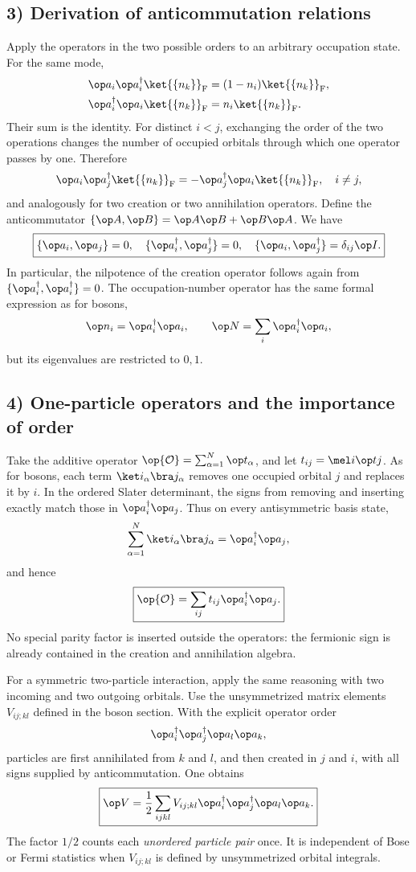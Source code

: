 \subsection*{3) Derivation of anticommutation relations}

Apply the operators in the two possible orders to an arbitrary occupation state. For the same mode,
\[\begin{aligned}
\op a_i\op a_i^\dagger\ket{\{n_k\}}_{\mathrm F}
 &=(1-n_i)\ket{\{n_k\}}_{\mathrm F},\\
\op a_i^\dagger\op a_i\ket{\{n_k\}}_{\mathrm F}
 &=n_i\ket{\{n_k\}}_{\mathrm F}.
\end{aligned}\]
Their sum is the identity. For distinct $i<j$, exchanging the order of the two operations changes the number of occupied orbitals through which one operator passes by one. Therefore
\[\op a_i\op a_j^\dagger\ket{\{n_k\}}_{\mathrm F}
 =-\op a_j^\dagger\op a_i\ket{\{n_k\}}_{\mathrm F},\quad i\ne j,\]
and analogously for two creation or two annihilation operators. Define the anticommutator $\{\op A,\op B\}=\op A\op B+\op B\op A$. We have
\[\boxed{\{\op a_i,\op a_j\}=0,\quad
\{\op a_i^\dagger,\op a_j^\dagger\}=0,\quad
\{\op a_i,\op a_j^\dagger\}=\delta_{ij}\op I.}\]
In particular, the nilpotence of the creation operator follows again from $\{\op a_i^\dagger,\op a_i^\dagger\}=0$. The occupation-number operator has the same formal expression as for bosons,
\[\op n_i=\op a_i^\dagger\op a_i,\qquad
\op N=\sum_i\op a_i^\dagger\op a_i,\]
but its eigenvalues are restricted to $0,1$.

\subsection*{4) One-particle operators and the importance of order}

Take the additive operator $\op{\mathcal O}=\sum_{\alpha=1}^N\op t_\alpha$, and let $t_{ij}=\mel i{\op t}j$. As for bosons, each term $\ket i_\alpha\bra j_\alpha$ removes one occupied orbital $j$ and replaces it by $i$. In the ordered Slater determinant, the signs from removing and inserting exactly match those in $\op a_i^\dagger\op a_j$. Thus on every antisymmetric basis state,
\[\sum_{\alpha=1}^N\ket i_\alpha\bra j_\alpha
=\op a_i^\dagger\op a_j,\]
and hence
\[\boxed{\op{\mathcal O}=\sum_{ij}t_{ij}\op a_i^\dagger\op a_j.}\]
No special parity factor is inserted outside the operators: the fermionic sign is already contained in the creation and annihilation algebra.

For a symmetric two-particle interaction, apply the same reasoning with two incoming and two outgoing orbitals. Use the unsymmetrized matrix elements $V_{ij;kl}$ defined in the boson section. With the explicit operator order
\[\op a_i^\dagger\op a_j^\dagger\op a_l\op a_k,\]
particles are first annihilated from $k$ and $l$, and then created in $j$ and $i$, with all signs supplied by anticommutation. One obtains
\[\boxed{\op V=\frac12\sum_{ijkl}V_{ij;kl}
\op a_i^\dagger\op a_j^\dagger\op a_l\op a_k.}\]
The factor $1/2$ counts each \emph{unordered particle pair} once. It is independent of Bose or Fermi statistics when $V_{ij;kl}$ is defined by unsymmetrized orbital integrals.

